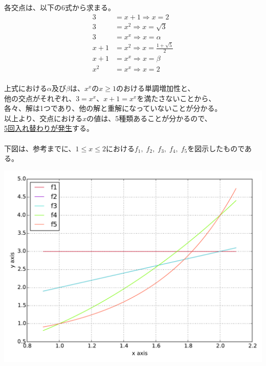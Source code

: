 \documentclass[a4j,10pt,oneside,openany]{jsbook}
\begin{document}
各交点は、以下の6式から求まる。\\
\begin{align*}
3 &= x+1 \Rightarrow x=2 \\
3 &= x^2 \Rightarrow x=\sqrt{3} \\
3 &= x^x \Rightarrow x=\alpha \\
x+1 &= x^2 \Rightarrow x=\frac{1+\sqrt{5}}{2} \\
x+1 &= x^x \Rightarrow x=\beta \\
x^2 &= x^x \Rightarrow x=2
\end{align*}
\\
上式における$\alpha$及び$\beta$は、$x^x$の$x \geq 1$のおける単調増加性と、\\
他の交点がそれぞれ、$3=x^x$、$x+1=x^x$を満たさないことから、\\
各々、解は1つであり、他の解と重解になっていないことが分かる。\\
以上より、交点における$x$の値は、5種類あることが分かるので、\\
\underline{5回入れ替わりが発生}する。
\\
\\
下図は、参考までに、$1 \leq x \leq 2$における$f_{1}, \; f_{2}, \; f_{3},\; f_{4},\; f_{5}$を図示したものである。

\includegraphics[width=15cm]{171.pdf}


\vspace{1\baselineskip}
\end{document}
